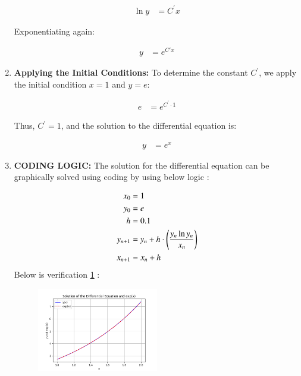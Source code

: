\documentclass[journal]{IEEEtran}
\begin{document}
\begin{enumerate}
    \begin{align}
	    \ln{y} &= C^\prime x
    \end{align}

    Exponentiating again:

    \begin{align}
    y &= e^{C' x}
    \end{align}
    
    \item \textbf{Applying the Initial Conditions:} To determine the constant $ C^\prime $, we apply the initial condition $ x = 1 $ and $ y = e $:

    \begin{align}
    e &= e^{C^\prime \cdot 1}
    \end{align}

    Thus, $ C^\prime = 1 $, and the solution to the differential equation is:

    \begin{align}
    y &= e^x
    \end{align}

\item \textbf{CODING LOGIC:} The solution for the differential equation can be graphically solved using coding by using below logic :

\begin{align} 
	x_0 &= 1 \\ 
	y_0 &= e  \\
	h&=0.1 \\
	y_{n+1} &= y_{n} + h\cdot\left(\frac{y_{n}\ln{y_{n}}}{x_{n}}\right) \\ 
	x_{n+1} &= x_{n} + h 
\end{align}
Below is verification \ref{fig:example} :
\begin{figure}[h]  %
    \centering  %
    \includegraphics[width=0.5\textwidth]{fig/Figure_1.png}  %
      \label{fig:example}  %
\end{figure}


\end{enumerate}
\end{document}
